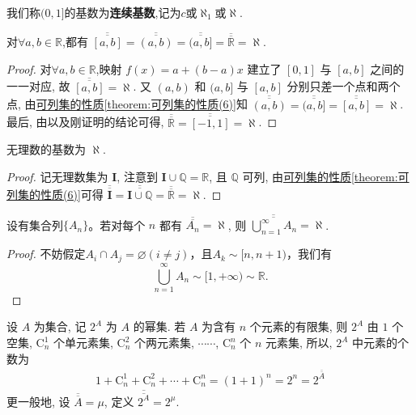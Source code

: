 \documentclass[../../main.tex]{subfiles}%
\begin{document}
\begin{definition}
我们称\((0,1]\)的基数为\textbf{连续基数},记为\(c\)或\(\aleph_1\)或$\aleph$.
\end{definition}

\begin{theorem}
对$\forall a,b\in \mathbb{R}$,都有
$\overline{\overline{[a, b]}} = \overline{\overline{(a, b)}} = \overline{\overline{(a, b]}} = \overline{\overline{\mathbb{R}}} = \aleph$.
\end{theorem}
\begin{proof}
对$\forall a,b\in \mathbb{R}$,映射 $f(x) = a + (b - a)x$ 建立了 $[0, 1]$ 与 $[a, b]$ 之间的一一对应, 故 $\overline{\overline{[a, b]}} = \aleph$. 又 $(a, b)$ 和 $(a, b]$ 与 $[a, b]$ 分别只差一个点和两个点, 由\hyperref[theorem:可列集的性质]{可列集的性质\ref{theorem:可列集的性质(6)}}知 $\overline{\overline{(a, b)}} = \overline{\overline{(a, b]}} = \overline{\overline{[a, b]}} = \aleph$. 最后, 由以及刚证明的结论可得, $\overline{\overline{\mathbb{R}}} = \overline{\overline{[-1, 1]}} = \aleph$.
\end{proof}

\begin{corollary}
无理数的基数为 $\aleph$.
\end{corollary}
\begin{proof}
记无理数集为 $\mathbf{I}$, 注意到 $\mathbf{I} \cup \mathbb{Q} = \mathbb{R}$, 且 $\mathbb{Q}$ 可列, 由\hyperref[theorem:可列集的性质]{可列集的性质\ref{theorem:可列集的性质(6)}}可得 $\overline{\overline{\mathbf{I}}} = \overline{\overline{\mathbf{I} \cup \mathbb{Q}}} = \overline{\overline{\mathbb{R}}} = \aleph$. 
\end{proof}

\begin{theorem}\label{theorem:无穷多个集列的并的势}
设有集合列\(\{A_n\}\)。若对每个 $n$ 都有 $\overline{\overline{A_n}} = \aleph$, 则 $\overline{\overline{\bigcup_{n = 1}^{\infty} A_n}} = \aleph$.
\end{theorem}
\begin{proof}
不妨假定\(A_i\cap A_j=\varnothing(i\neq j)\)，且\(A_k\sim[n,n + 1)\)，我们有
\[\bigcup_{n = 1}^{\infty}A_n\sim[1,+\infty)\sim\mathbb{R}.\]
\end{proof}

\begin{definition}
设 $A$ 为集合, 记 $2^A$ 为 $A$ 的幂集. 若 $A$ 为含有 $n$ 个元素的有限集, 则 $2^A$ 由 $1$ 个空集, $\mathrm{C}_{n}^1$ 个单元素集, $\mathrm{C}_{n}^2$ 个两元素集, $\cdots\cdots$, $\mathrm{C}_{n}^n$ 个 $n$ 元素集, 所以, $2^A$ 中元素的个数为
\begin{align*}
1 + \mathrm{C}_{n}^1 + \mathrm{C}_{n}^2 + \cdots + \mathrm{C}_{n}^n = (1 + 1)^n = 2^n = 2^{\overline{\overline{A}}}
\end{align*}
更一般地, 设 $\overline{\overline{A}} = \mu$, 定义 $\overline{\overline{2^A}} = 2^{\mu}$.
\end{definition}
\end{document}
